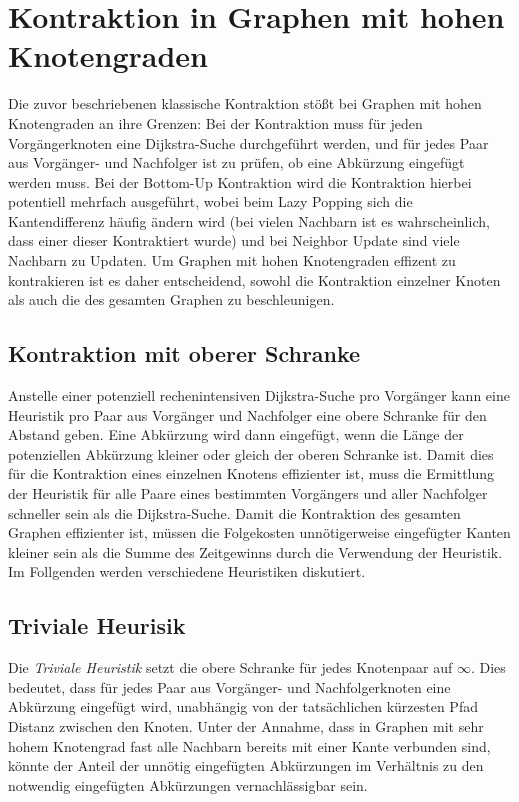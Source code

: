 \chapter{Kontraktion in Graphen mit hohen Knotengraden}

Die zuvor beschriebenen klassische Kontraktion stößt bei Graphen mit hohen Knotengraden an ihre Grenzen:
Bei der Kontraktion muss für jeden Vorgängerknoten eine Dijkstra-Suche durchgeführt werden, und für jedes Paar aus Vorgänger- und Nachfolger ist zu prüfen, ob eine Abkürzung eingefügt werden muss.
Bei der Bottom-Up Kontraktion wird die Kontraktion hierbei potentiell mehrfach ausgeführt, wobei beim Lazy Popping sich die Kantendifferenz häufig ändern wird (bei vielen Nachbarn ist es wahrscheinlich, dass einer dieser Kontraktiert wurde) und bei Neighbor Update sind viele Nachbarn zu Updaten.
Um Graphen mit hohen Knotengraden effizent zu kontrakieren ist es daher entscheidend, sowohl die Kontraktion einzelner Knoten als auch die des gesamten Graphen zu beschleunigen.

\section{Kontraktion mit oberer Schranke}
Anstelle einer potenziell rechenintensiven Dijkstra-Suche pro Vorgänger kann eine Heuristik pro Paar aus Vorgänger und Nachfolger eine obere Schranke für den Abstand geben.
Eine Abkürzung wird dann eingefügt, wenn die Länge der potenziellen Abkürzung kleiner oder gleich der oberen Schranke ist.
Damit dies für die Kontraktion eines einzelnen Knotens effizienter ist, muss die Ermittlung der Heuristik für alle Paare eines bestimmten Vorgängers und aller Nachfolger schneller sein als die Dijkstra-Suche.
Damit die Kontraktion des gesamten Graphen effizienter ist, müssen die Folgekosten unnötigerweise eingefügter Kanten kleiner sein als die Summe des Zeitgewinns durch die Verwendung der Heuristik.
Im Follgenden werden verschiedene Heuristiken diskutiert.

\section{Triviale Heurisik}
Die \emph{Triviale Heuristik} setzt die obere Schranke für jedes Knotenpaar auf $\infty$.
Dies bedeutet, dass für jedes Paar aus Vorgänger- und Nachfolgerknoten eine Abkürzung eingefügt wird, unabhängig von der tatsächlichen kürzesten Pfad Distanz zwischen den Knoten.
Unter der Annahme, dass in Graphen mit sehr hohem Knotengrad fast alle Nachbarn bereits mit einer Kante verbunden sind, könnte der Anteil der unnötig eingefügten Abkürzungen im Verhältnis zu den notwendig eingefügten Abkürzungen vernachlässigbar sein.

